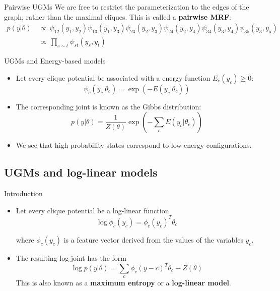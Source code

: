 \documentclass[10pt,mathserif]{beamer}
\begin{document}
\begin{frame}{Pairwise UGMs}
We are free to restrict the parameterization to the edges of the graph, rather than the maximal cliques. This is called a \textbf{pairwise MRF}:
\begin{equation}
    \begin{split}
        p(y|\theta) &  \ \propto \ \psi_{12}(y_1, y_2)\psi_{13}(y_1, y_3)\psi_{23}(y_2, y_3)\psi_{24}(y_2, y_4)\psi_{34}(y_3, y_4)\psi_{35}(y_3, y_5)\\
        & \ \propto \ \prod_{s\sim t}\psi_{st}(y_s,y_t)
    \end{split}
\end{equation}
\end{frame}

\begin{frame}{UGMs and Energy-based models}
\begin{itemize}
    \item Let every clique potential be associated with a energy function $E_c(y_c) \geq 0$:
    \begin{equation}
        \psi_c(y_c|\theta_c) = \exp(-E(y_c|\theta_c))
    \end{equation}
    
    \item The corresponding joint is known as the Gibbs distribution:
    \begin{equation}
        p(y|\theta) = \frac{1}{Z(\theta)} \exp(-\sum_c E(y_c|\theta_c))
    \end{equation}
    
    \item We see that high probability states correspond to low energy configurations.
\end{itemize}
\end{frame}

\subsection{UGMs and log-linear models}
\begin{frame}{Introduction}
\begin{itemize}
    \item Let every clique potential be a log-linear function
    \begin{equation}
        \log\phi_c(y_c) = \phi_c(y_c)^T \theta_c
    \end{equation}
    
    where $\phi_c(y_c)$ is a feature vector derived from the values of the variables $y_c$.
    
    \item The resulting log joint has the form
    \begin{equation}
        \log p(y|\theta)= \sum_c \phi_c(y-c)^T\theta_c -Z(\theta)
    \end{equation}
    This is also known as a \textbf{maximum entropy} or a \textbf{log-linear model}.
\end{itemize}
\end{frame}
\end{document}
